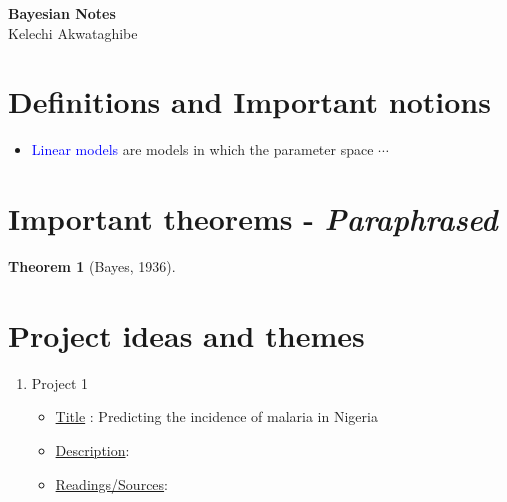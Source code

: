 \documentclass[letterpaper,11pt]{report}
\newcommand{\blue}[1]{\textcolor{blue}{#1}}
\theoremstyle{definition}
\newtheorem{thm}{Theorem}
\begin{document}
\begin{center}
 \textbf{Bayesian Notes }\\
Kelechi Akwataghibe\\
  \end{center}
  
\section{Definitions and Important notions}

\begin{itemize}
\item \blue{Linear models} are models in which the parameter space $\cdots$
\end{itemize}

\section{Important theorems - \textit{Paraphrased}}
\begin{thm}[Bayes, 1936]

\end{thm}


\section{Project ideas and themes}
\begin{enumerate}
\item  Project 1
\begin{itemize}
\item \underline{Title} : Predicting the incidence of malaria in Nigeria
\item \underline{Description}:
\item \underline{Readings/Sources}:
\end{itemize}
\end{enumerate}
\end{document}
